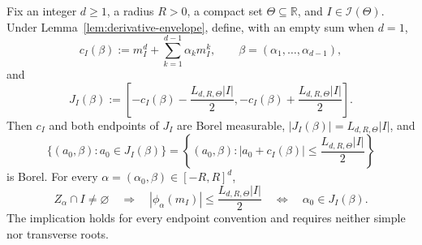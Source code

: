 \begin{proposition}
\label{prop:midpoint-slab}
Fix an integer $d\geq1$, a radius $R>0$, a compact set
$\Theta\subseteq\mathbb R$, and $I\in\mathscr I(\Theta)$.  Under
Lemma~\ref{lem:derivative-envelope}, define, with an empty sum when
$d=1$,
\[
c_I(\beta):=m_I^d+\sum_{k=1}^{d-1}\alpha_km_I^k,
\qquad \beta=(\alpha_1,\ldots,\alpha_{d-1}),
\]
and
\[
J_I(\beta):=
\left[-c_I(\beta)-\frac{L_{d,R,\Theta}|I|}{2},
      -c_I(\beta)+\frac{L_{d,R,\Theta}|I|}{2}\right].
\]
Then $c_I$ and both endpoints of $J_I$ are Borel measurable,
$|J_I(\beta)|=L_{d,R,\Theta}|I|$, and
\[
\{(a_0,\beta):a_0\in J_I(\beta)\}
=\left\{(a_0,\beta):
|a_0+c_I(\beta)|\leq\frac{L_{d,R,\Theta}|I|}{2}\right\}
\]
is Borel.  For every $\alpha=(\alpha_0,\beta)\in[-R,R]^d$,
\[
Z_\alpha\cap I\neq\varnothing
\quad\Longrightarrow\quad
|\phi_\alpha(m_I)|
\leq\frac{L_{d,R,\Theta}|I|}{2}
\quad\Longleftrightarrow\quad
\alpha_0\in J_I(\beta).
\]
The implication holds for every endpoint convention and requires neither
simple nor transverse roots.
\end{proposition}

